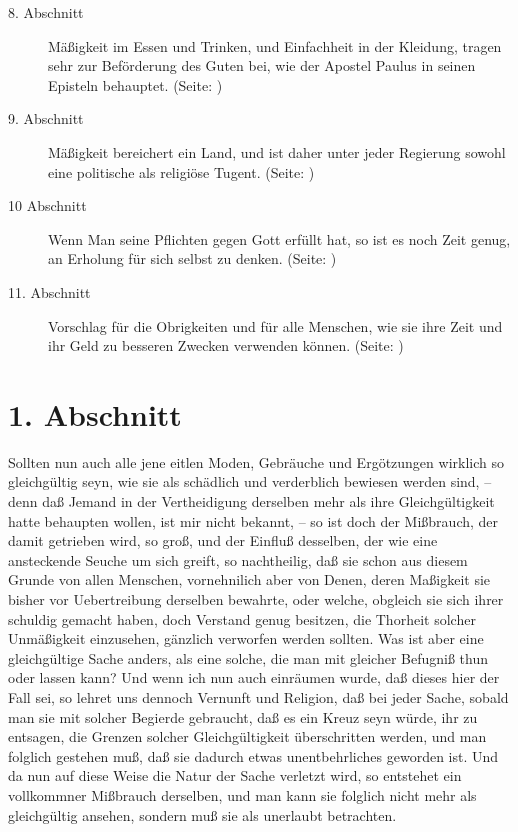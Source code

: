 \begin{description}
\item[8. Abschnitt] Mäßigkeit im Essen und Trinken, und Einfachheit in der
Kleidung, tragen sehr zur Beförderung des Guten bei, wie der Apostel Paulus in
seinen Episteln behauptet. (Seite: \pageref{kap18_ab8})
\item[9. Abschnitt] Mäßigkeit bereichert ein Land, und ist daher unter jeder
Regierung sowohl eine politische als religiöse Tugent. (Seite: \pageref{kap18_ab9})
\item[10 Abschnitt] Wenn Man seine Pflichten gegen Gott erfüllt hat, so ist es
noch Zeit genug, an Erholung für sich selbst zu denken. (Seite: \pageref{kap18_ab10})
\item[11. Abschnitt] Vorschlag für die Obrigkeiten und für alle Menschen, wie
sie ihre Zeit und ihr Geld zu besseren Zwecken verwenden können. (Seite: \pageref{kap18_ab11})

\end{description}
\normalsize

\section{1. Abschnitt} \label{kap18_ab1}

Sollten nun auch alle jene eitlen Moden, Gebräuche und Ergötzungen wirklich so
gleichgültig seyn, wie sie als schädlich und verderblich bewiesen werden sind,
-- denn daß Jemand in der Vertheidigung derselben mehr als ihre Gleichgültigkeit
hatte behaupten wollen, ist mir nicht bekannt, -- so ist doch der Mißbrauch, der
damit getrieben wird, so groß, und der Einfluß desselben, der wie eine
ansteckende Seuche um sich greift, so nachtheilig, daß sie schon aus diesem
Grunde von allen Menschen, vornehnilich aber von Denen, deren Maßigkeit sie
bisher vor Uebertreibung derselben bewahrte, oder welche, obgleich sie sich
ihrer schuldig gemacht haben, doch Verstand genug besitzen, die Thorheit solcher
Unmäßigkeit einzusehen, gänzlich verworfen werden sollten. Was ist aber eine
gleichgültige Sache anders, als eine solche, die man mit gleicher Befugniß thun
oder lassen kann? Und wenn ich nun auch einräumen wurde, daß dieses hier der
Fall sei, so lehret uns dennoch Vernunft und Religion, daß bei jeder Sache,
sobald man sie mit solcher Begierde gebraucht, daß es ein Kreuz seyn würde, ihr
zu entsagen, die Grenzen solcher Gleichgültigkeit überschritten werden, und man
folglich gestehen muß, daß sie dadurch etwas unentbehrliches geworden ist. Und
da nun auf diese Weise die Natur der Sache verletzt wird, so entstehet ein
vollkommner Mißbrauch derselben, und man kann sie folglich nicht mehr als
gleichgültig ansehen, sondern muß sie als unerlaubt betrachten.

